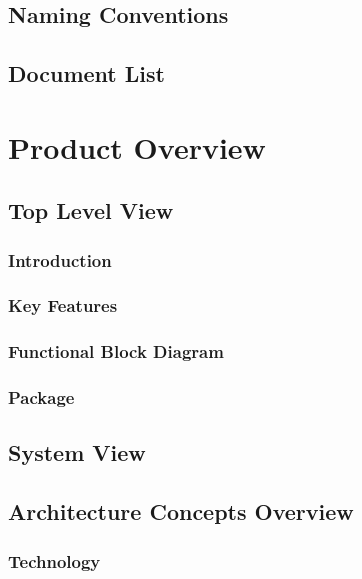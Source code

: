 \section{Naming Conventions}

\section{Document List}



\chapter{Product Overview}
\section{Top Level View}

\subsection{Introduction}


\subsection{Key Features}

\subsection{Functional Block Diagram}



\subsection{Package}

\section{System View}


\section{Architecture Concepts Overview}

\subsection{Technology}

